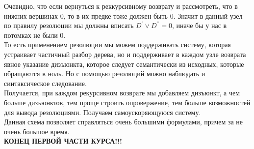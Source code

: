 Очевидно, что если вернуться к реккурсивному возврату и рассмотреть, что в нижних вершинах 0, то в их предке тоже должен быть 0. Значит в данный узел по правилу резолюции мы должны вписать $D^{'}\vee D^{''}=0$, иначе бы у нас в потомках не были 0. \\
То есть применением резолюции мы можем поддерживать систему, которая устраивает частичный разбор дерева, но и поддерживает в каждом узле возврата явное указание дизъюнкта, которое следует семантически из исходных, которые обращаются в ноль. Но с помощью резолюций можно наблюдать и синтаксическое следование.\\
Получается, при каждом рекурсивном возврате мы добавляем дизъюнкт, а чем больше дизъюнктов, тем проще строить опровержение, тем больше возможностей для вывода резолюциями. Получаем самоускоряющуюся систему. \\
Данная схема позволяет справляться очень большими формулами, причем за не очень большое время.\\
\textbf{КОНЕЦ ПЕРВОЙ ЧАСТИ КУРСА!!!}











